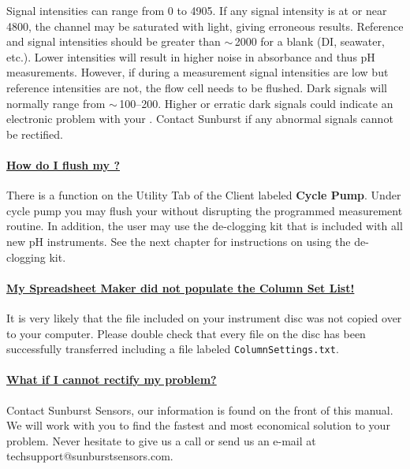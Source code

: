 \else			%

Signal intensities can range from 0 to 4905. If any signal intensity is at or near 4800, the channel may be saturated with light, giving erroneous results. Reference and signal intensities should be greater than $\sim$\,2000 for a blank (DI, seawater, etc.).  Lower intensities will result in higher noise in absorbance and thus pH measurements. However, if during a measurement signal intensities are low but reference intensities are not, the flow cell needs to be flushed. Dark signals will normally range from $\sim$\,100--200. Higher or erratic dark signals could indicate an electronic problem with your \instType{}.  Contact Sunburst if any abnormal signals cannot be rectified.

\fi

\paragraph{\underline{How do I flush my \instType{}?}}
There is a function on the Utility Tab of the \instType{} Client labeled \textbf{Cycle Pump}. Under cycle pump you may flush your \instType{} without disrupting the programmed measurement routine.  In addition, the user may use the de-clogging kit that is included with all new pH instruments.  See the next chapter for instructions on using the de-clogging kit.

\paragraph{\underline{My Spreadsheet Maker did not populate the Column Set List!}}
It is very likely that the file included on your instrument disc was not copied over to your computer. Please double check that every file on the disc has been successfully transferred including a file labeled \verb|ColumnSettings.txt|.   

\paragraph{\underline{What if I cannot rectify my problem?}}
Contact Sunburst Sensors, our information is found on the front of this manual. We will work with you to find the fastest and most economical solution to your problem. Never hesitate to give us a call or send us an e-mail at techsupport@sunburstsensors.com.